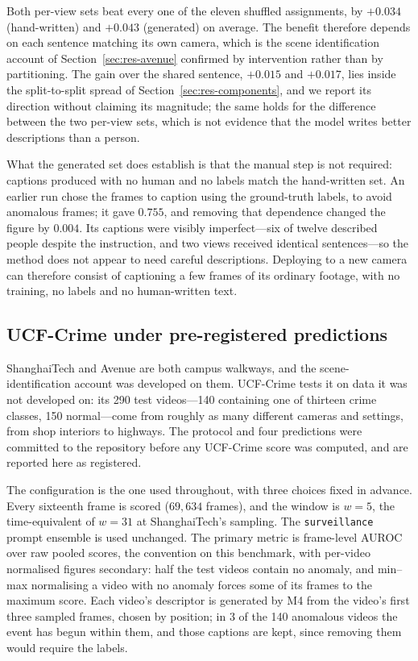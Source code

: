 \documentclass[a4paper,fleqn]{cas-sc}
\begin{document}
Both per-view sets beat every one of the eleven shuffled assignments, by
$+0.034$ (hand-written) and $+0.043$ (generated) on average. The benefit
therefore depends on each sentence matching its own camera, which is the scene
identification account of Section~\ref{sec:res-avenue} confirmed by
intervention rather than by partitioning. The gain over the shared sentence,
$+0.015$ and $+0.017$, lies inside the split-to-split spread of
Section~\ref{sec:res-components}, and we report its direction without claiming
its magnitude; the same holds for the difference between the two per-view sets,
which is not evidence that the model writes better descriptions than a person.

What the generated set does establish is that the manual step is not required:
captions produced with no human and no labels match the hand-written set. An
earlier run chose the frames to caption using the ground-truth labels, to avoid
anomalous frames; it gave $0.755$, and removing that dependence changed the
figure by $0.004$. Its captions were visibly imperfect---six of twelve described
people despite the instruction, and two views received identical sentences---so
the method does not appear to need careful descriptions. Deploying to a new camera can therefore consist of
captioning a few frames of its ordinary footage, with no training, no labels and
no human-written text.

\subsection{UCF-Crime under pre-registered predictions}
\label{sec:res-ucf}
ShanghaiTech and Avenue are both campus walkways, and the scene-identification
account was developed on them. UCF-Crime \citep{sultani2018ucfcrime} tests it on
data it was not developed on: its 290 test videos---140 containing one of
thirteen crime classes, 150 normal---come from roughly as many different cameras
and settings, from shop interiors to highways. The protocol and four predictions
were committed to the repository before any UCF-Crime score was computed, and are
reported here as registered.

The configuration is the one used throughout, with three choices fixed in
advance. Every sixteenth frame is scored ($69{,}634$ frames), and the window is
$w{=}5$, the time-equivalent of $w{=}31$ at ShanghaiTech's sampling. The
\texttt{surveillance} prompt ensemble is used unchanged. The primary metric is
frame-level AUROC over raw pooled scores, the convention on this benchmark, with
per-video normalised figures secondary: half the test videos contain no anomaly,
and min--max normalising a video with no anomaly forces some of its frames to the
maximum score. Each video's descriptor is generated by M4 from the video's first
three sampled frames, chosen by position; in 3 of the 140 anomalous videos the
event has begun within them, and those captions are kept, since removing them
would require the labels.
\end{document}
